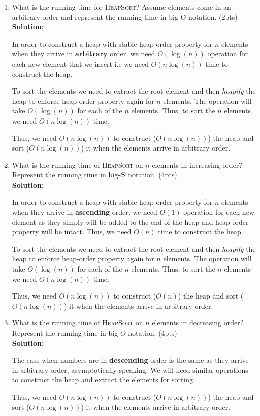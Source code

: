 \documentclass[11pt]{article}
\begin{document}
\begin{enumerate}
\item What is the running time for \textsc{HeapSort}? Assume elements come in an arbitrary order and represent the running time in big-O notation. (2pts) \\
\textbf{Solution:} 

In order to construct a heap with stable heap-order property for $ n $ elements when they arrive in \textbf{arbitrary} order, we need $O(\log(n))$ operation for each new element that we insert i.e we need $O(n\log(n))$ time to construct the heap.

To sort the elements we need to extract the root element and then \textit{heapify} the heap to enforce heap-order property again for $ n $ elements. The operation will take $O(\log(n))$ for each of the $ n $ elements. Thus, to sort the $ n $ elements we need $O(n\log(n))$ time.

Thus, we need $ O(n\log(n)) $ to construct ($ O(n\log(n)) $) the heap and sort ($ O(n\log(n)) $) it when the elements arrive in arbitrary order. \\

\item What is the running time of \textsc{HeapSort} on $n$ elements in increasing order? Represent the running time in big-$\Theta$ notation. (4pts) \\
\textbf{Solution:} 

In order to construct a heap with stable heap-order property for $ n $ elements when they arrive in \textbf{ascending} order, we need $O(1)$ operation for each new element as they simply will be added to the end of the heap and heap-order property will be intact. Thus, we need $O(n)$ time to construct the heap.

To sort the elements we need to extract the root element and then \textit{heapify} the heap to enforce heap-order property again for $ n $ elements. The operation will take $O(\log(n))$ for each of the $ n $ elements. Thus, to sort the $ n $ elements we need $O(n\log(n))$ time.

Thus, we need $ O(n\log(n)) $ to construct ($O(n)$) the heap and sort ($O(n\log(n))$) it when the elements arrive in arbitrary order. \\

\item What is the running time of \textsc{HeapSort} on $n$ elements in decreasing order?  Represent the running time in big-$\Theta$ notation. (4pts) \\
\textbf{Solution:} 

The case when numbers are in \textbf{descending} order is the same as they arrive in arbitrary order, asymptotically speaking. We will need similar operations to construct the heap and extract the elements for sorting.

Thus, we need $ O(n\log(n)) $ to construct ($ O(n\log(n)) $) the heap and sort ($ O(n\log(n)) $) it when the elements arrive in arbitrary order. \\
\end{enumerate}
\end{document}
